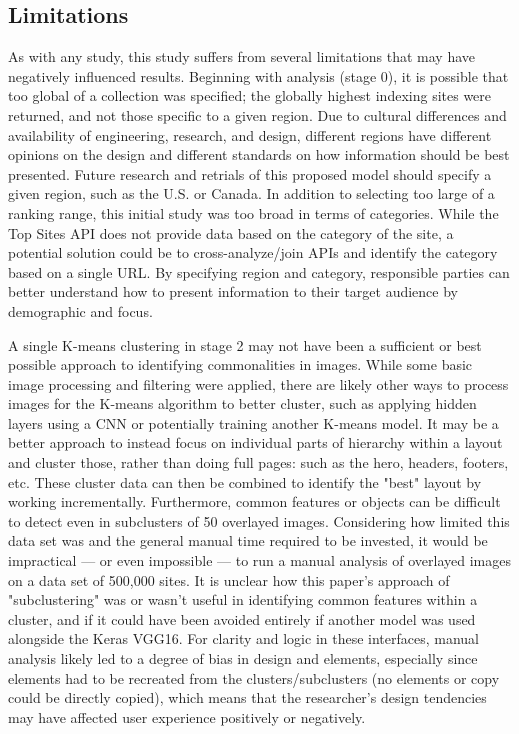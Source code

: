 \documentclass[conference]{IEEEtran}
\begin{document}
\subsection{Limitations}

As with any study, this study suffers from several limitations that may have negatively influenced results. Beginning with analysis (stage 0), it is possible that too global of a collection was specified; the globally highest indexing sites were returned, and not those specific to a given region. Due to cultural differences and availability of engineering, research, and design, different regions have different opinions on the design and different standards on how information should be best presented. Future research and retrials of this proposed model should specify a given region, such as the U.S. or Canada. In addition to selecting too large of a ranking range, this initial study was too broad in terms of categories. While the Top Sites API \cite{antoniou_2015} does not provide data based on the category of the site, a potential solution could be to cross-analyze/join APIs and identify the category based on a single URL. By specifying region and category, responsible parties can better understand how to present information to their target audience by demographic and focus.

A single K-means clustering in stage 2 may not have been a sufficient or best possible approach to identifying commonalities in images. While some basic image processing and filtering were applied, there are likely other ways to process images for the K-means algorithm to better cluster, such as applying hidden layers using a CNN or potentially training another K-means model. It may be a better approach to instead focus on individual parts of hierarchy within a layout and cluster those, rather than doing full pages: such as the hero, headers, footers, etc. These cluster data can then be combined to identify the "best" layout by working incrementally. Furthermore, common features or objects can be difficult to detect even in subclusters of 50 overlayed images. Considering how limited this data set was and the general manual time required to be invested, it would be impractical — or even impossible — to run a manual analysis of overlayed images on a data set of 500,000 sites. It is unclear how this paper's approach of "subclustering" was or wasn't useful in identifying common features within a cluster, and if it could have been avoided entirely if another model was used alongside the Keras VGG16. For clarity and logic in these interfaces, manual analysis likely led to a degree of bias in design and elements, especially since elements had to be recreated from the clusters/subclusters (no elements or copy could be directly copied), which means that the researcher's design tendencies may have affected user experience positively or negatively.
\end{document}
